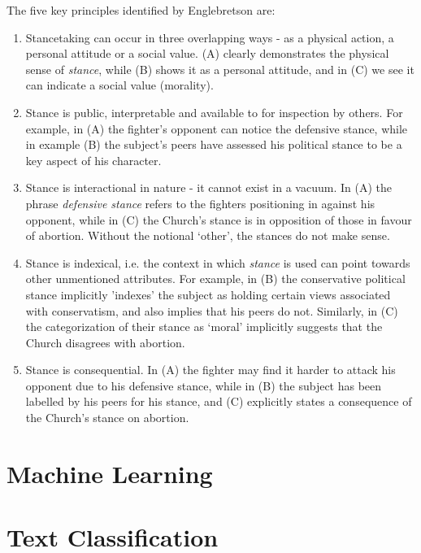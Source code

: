 \documentclass[Dissertation.tex]{subfiles}
\begin{document}
The five key principles identified by Englebretson \cite{englebretsonStancetakingDiscourseSubjectivity2007} are:
\begin{enumerate}
	\item Stancetaking can occur in three overlapping ways - as a physical action, a personal attitude or a social value. (A) clearly demonstrates the physical sense of \textit{stance}, while (B) shows it as a personal attitude, and in (C) we see it can indicate a social value (morality). 
	
	\item Stance is public, interpretable and available to for inspection by others. For example, in (A) the fighter's opponent can notice the defensive stance, while in example (B) the subject's peers have assessed his political stance to be a key aspect of his character.
	
	\item Stance is interactional in nature - it cannot exist in a vacuum. In (A) the  phrase \textit{defensive stance} refers to the fighters positioning in against his opponent, while in (C) the Church's stance is in opposition of those in favour of abortion. Without the notional `other', the stances do not make sense.
	
	\item Stance is indexical, i.e. the context in which \textit{stance} is used can point towards other unmentioned attributes. For example, in (B) the conservative political stance implicitly 'indexes' the subject as holding certain views  associated with conservatism, and also implies that his peers do not. Similarly, in (C) the categorization of their stance as `moral' implicitly suggests that the Church disagrees with abortion.
	
	\item Stance is consequential. In (A) the fighter may find it harder to attack his opponent due to his defensive stance, while in (B) the subject has been labelled by his peers for his stance, and (C) explicitly states a consequence of the Church's stance on abortion.
\end{enumerate}



\section{Machine Learning}
\section{Text Classification}
\end{document}
